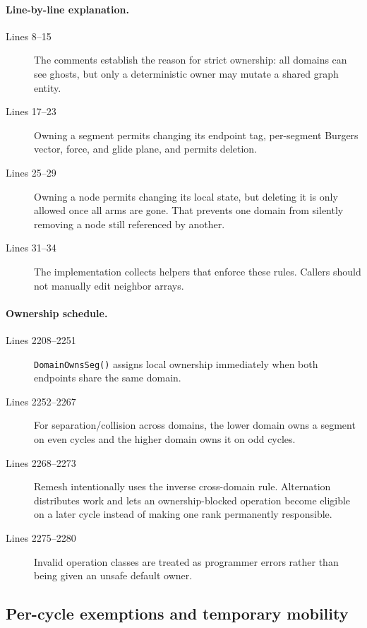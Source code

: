 \documentclass[11pt]{article}
\newcommand{\code}[1]{\texorpdfstring{\nolinkurl{#1}}{#1}}
\begin{document}


\paragraph{Line-by-line explanation.}
\begin{description}
\item[Lines 8--15] The comments establish the reason for strict ownership:
all domains can see ghosts, but only a deterministic owner may mutate a shared
graph entity.
\item[Lines 17--23] Owning a segment permits changing its endpoint tag,
per-segment Burgers vector, force, and glide plane, and permits deletion.
\item[Lines 25--29] Owning a node permits changing its local state, but
deleting it is only allowed once all arms are gone. That prevents one domain
from silently removing a node still referenced by another.
\item[Lines 31--34] The implementation collects helpers that enforce these
rules. Callers should not manually edit neighbor arrays.
\end{description}



\paragraph{Ownership schedule.}
\begin{description}
\item[Lines 2208--2251] \code{DomainOwnsSeg()} assigns local ownership
immediately when both endpoints share the same domain.
\item[Lines 2252--2267] For separation/collision across domains, the lower
domain owns a segment on even cycles and the higher domain owns it on odd
cycles.
\item[Lines 2268--2273] Remesh intentionally uses the inverse cross-domain
rule. Alternation distributes work and lets an ownership-blocked operation
become eligible on a later cycle instead of making one rank permanently
responsible.
\item[Lines 2275--2280] Invalid operation classes are treated as programmer
errors rather than being given an unsafe default owner.
\end{description}

\subsection{Per-cycle exemptions and temporary mobility}
\end{document}
